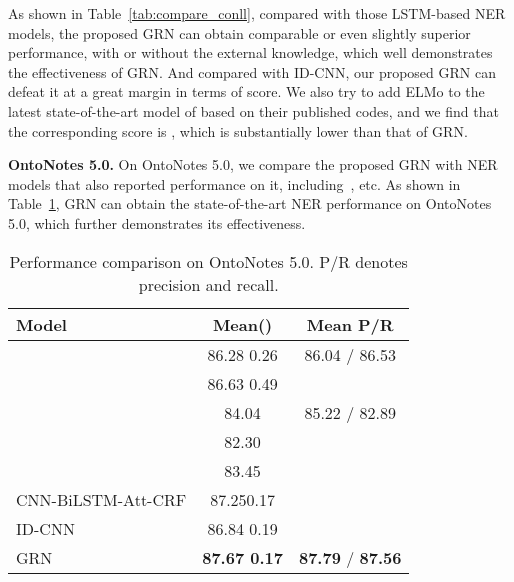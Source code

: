 \documentclass[letterpaper]{article} \usepackage{aaai19}  \usepackage{times}  \usepackage{helvet}  \usepackage{courier}  \usepackage{url}  \usepackage{graphicx}  \usepackage{amsmath}
\newcommand{\GRN}{GRN}
\begin{document}
As shown in Table~\ref{tab:compare_conll}, compared with those LSTM-based NER models, the proposed \GRN{} can obtain comparable or even slightly superior performance, with or without the external knowledge, which well demonstrates the effectiveness of \GRN{}. And compared with ID-CNN, our proposed \GRN{} can defeat it at a great margin in terms of  score. We also try to add ELMo to the latest state-of-the-art model of \cite{Ye2018HSCRF} based on their published codes, and we find that the corresponding  score is , which is substantially lower than that of \GRN{}.



\textbf{OntoNotes 5.0.}
On OntoNotes 5.0, we compare the proposed \GRN{} with NER models that also reported performance on it,  including~\cite{chiu2016named,shen2017deep,durrett2014joint}, etc. As shown in Table~\ref{tab:compare_OntoNote}, \GRN{} can obtain the state-of-the-art NER performance on OntoNotes 5.0, which further demonstrates its effectiveness.

\begin{table}[t!]
  \centering
    \begin{adjustbox}{width=0.95\columnwidth}
    \begin{tabular}{|l|c|c|}
      \hline
       Model & Mean()  & Mean P/R  \\ \hline
       \cite{chiu2016named} & 86.28  0.26 & 86.04 / 86.53\\ \hline
       \cite{shen2017deep} & 86.63  0.49 & \\ \hline
       \cite{durrett2014joint} & 84.04 & 85.22 / 82.89\\ \hline
       \cite{passos2014lexicon} & 82.30 & \\ \hline
       \cite{ratinov2009design} & 83.45 & \\ \hline
       CNN-BiLSTM-Att-CRF &87.250.17 &\\ \hline
       ID-CNN~\cite{strubell2017fast} & 86.84  0.19 &  \\ \hline
       \GRN{} & \textbf{87.67  0.17} & \textbf{87.79} / \textbf{87.56}\\ \hline
    \end{tabular}
    \end{adjustbox}
    \caption{Performance comparison on OntoNotes 5.0. P/R denotes precision and recall.}
    \label{tab:compare_OntoNote}
\end{table}
\end{document}
